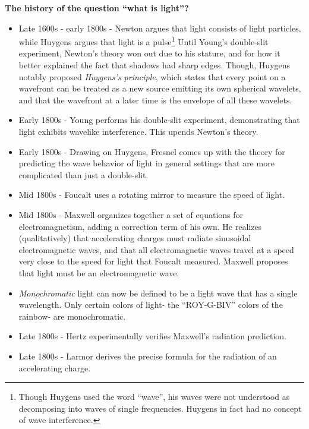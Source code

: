 \documentclass{article}
\begin{document}
\textbf{The history of the question ``what is light''?}
\begin{itemize}
	\item Late 1600s - early 1800s - Newton argues that light consists of light particles, while Huygens argues that light is a pulse\footnote{Though Huygens used the word ``wave'', his waves were not understood as decomposing into waves of single frequencies. Huygens in fact had no concept of wave interference.} Until Young's double-slit experiment, Newton's theory won out due to his stature, and for how it better explained the fact that shadows had sharp edges. Though, Huygens notably proposed \textit{Huygens's principle}, which states that every point on a wavefront can be treated as a new source emitting its own spherical wavelets, and that the wavefront at a later time is the envelope of all these wavelets.
	\item Early 1800s - Young performs his double-slit experiment, demonstrating that light exhibits wavelike interference. This upends Newton's theory.
	\item Early 1800s - Drawing on Huygens, Fresnel comes up with the theory for predicting the wave behavior of light in general settings that are more complicated than just a double-slit.
	\item Mid 1800s - Foucalt uses a rotating mirror to measure the speed of light.
	\item Mid 1800s - Maxwell organizes together a set of equations for electromagnetism, adding a correction term of his own. He realizes (qualitatively) that accelerating charges must radiate sinusoidal electromagnetic waves, and that all electromagnetic waves travel at a speed very close to the speed for light that Foucalt measured. Maxwell proposes that light must be an electromagnetic wave.
	\item \textit{Monochromatic} light can now be defined to be a light wave that has a single wavelength. Only certain colors of light- the ``ROY-G-BIV'' colors of the rainbow- are monochromatic.
	\item Late 1800s - Hertz experimentally verifies Maxwell's radiation prediction.
	\item Late 1800s - Larmor derives the precise formula for the radiation of an accelerating charge.
\end{itemize}
\end{document}
